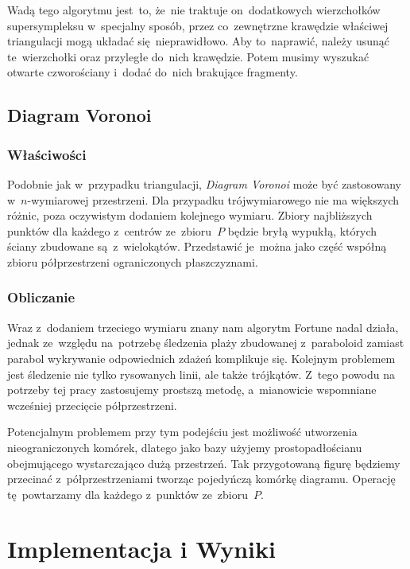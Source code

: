 \documentclass[skorowidz,autorrok,backref,xodstep,oswiadczenie]{wmimgr}
\begin{document}
Wadą tego algorytmu jest~to, że~nie traktuje on~dodatkowych wierzchołków supersympleksu w~specjalny sposób, przez co~zewnętrzne krawędzie właściwej triangulacji mogą układać się~nieprawidłowo. Aby to~naprawić, należy usunąć te~wierzchołki oraz przyległe do~nich krawędzie. Potem musimy wyszukać otwarte czworościany i~dodać do~nich brakujące fragmenty.

\section{Diagram Voronoi}

\subsection{Właściwości}

Podobnie jak w~przypadku triangulacji, \emph{Diagram Voronoi} może być zastosowany w~$n$-wymiarowej przestrzeni. Dla przypadku trójwymiarowego nie ma większych różnic, poza oczywistym dodaniem kolejnego wymiaru. Zbiory najbliższych punktów dla każdego z~centrów ze~zbioru~$P$ będzie bryłą wypukłą, których ściany zbudowane są~z~wielokątów. Przedstawić je~można jako część współną zbioru półprzestrzeni ograniczonych płaszczyznami.

\subsection{Obliczanie}

Wraz z~dodaniem trzeciego wymiaru znany nam algorytm Fortune nadal działa, jednak ze~względu na~potrzebę śledzenia plaży zbudowanej z~paraboloid zamiast parabol wykrywanie odpowiednich zdażeń komplikuje się. Kolejnym problemem jest śledzenie nie tylko rysowanych linii, ale także trójkątów. Z~tego powodu na potrzeby tej pracy zastosujemy prostszą metodę, a~mianowicie wspomniane wcześniej przecięcie półprzestrzeni.

Potencjalnym problemem przy tym podejściu jest możliwość utworzenia nieograniczonych komórek, dlatego jako bazy użyjemy prostopadłościanu obejmującego wystarczająco dużą przestrzeń. Tak przygotowaną figurę będziemy przecinać z~półprzestrzeniami tworząc pojedyńczą komórkę diagramu. Operację tę~powtarzamy dla każdego z~punktów ze~zbioru~$P$.

\chapter{Implementacja i Wyniki}
\end{document}
